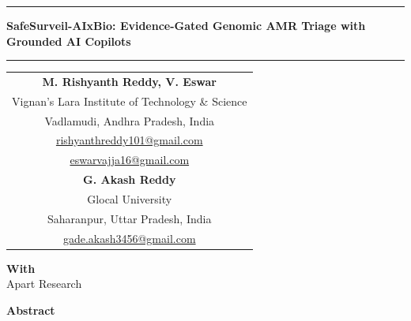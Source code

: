 \documentclass[11pt, letterpaper]{article}
\newcommand{\project}{SafeSurveil-AIxBio}
\begin{document}
\noindent\rule{\textwidth}{1.5pt} \par
\vspace{0.4cm}
\begin{center}
    {\fontsize{20}{24}\selectfont \textbf{\project: Evidence-Gated Genomic AMR Triage with Grounded AI Copilots}\footnotemark}
\end{center}
\vspace{0.1cm}
\noindent\rule{\textwidth}{0.5pt} \par
\vspace{0.65cm}


\begin{center}
\begin{tabular}{@{}c@{}}
\textbf{M. Rishyanth Reddy, V. Eswar} \\
Vignan's Lara Institute of Technology \& Science \\
Vadlamudi, Andhra Pradesh, India \\
\href{mailto:rishyanthreddy101@gmail.com}{rishyanthreddy101@gmail.com} \\
\href{mailto:eswarvajja16@gmail.com}{eswarvajja16@gmail.com} \\[0.35cm]
\textbf{G. Akash Reddy} \\
Glocal University \\
Saharanpur, Uttar Pradesh, India \\
\href{mailto:gade.akash3456@gmail.com}{gade.akash3456@gmail.com}
\end{tabular}
\end{center}
\vspace{0.2cm}

\begin{center}
    \textbf{With} \\
    Apart Research
\end{center}
\vspace{0.4cm}

\begin{center}
    \textbf{\fontsize{14}{17}\selectfont Abstract}
\end{center}
\vspace{0.1cm}
\end{document}
